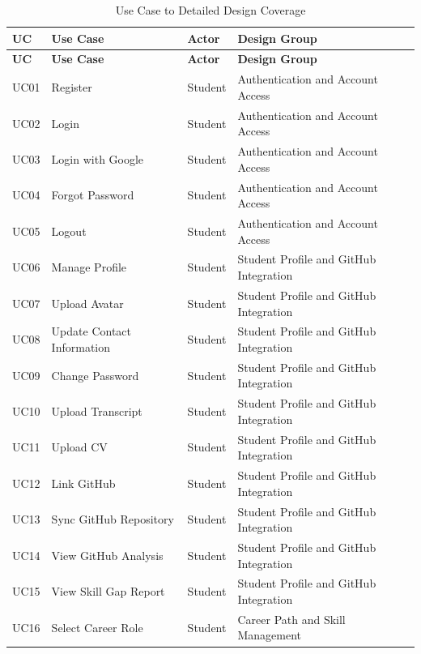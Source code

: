 \setlength{\tabcolsep}{2pt}
\scriptsize
\begin{longtable}{|>{\centering\arraybackslash}m{0.8cm}|>{\raggedright\arraybackslash}m{3.0cm}|>{\raggedright\arraybackslash}m{2.4cm}|>{\raggedright\arraybackslash}m{4.8cm}|}
\caption{Use Case to Detailed Design Coverage}
\label{tab:uc_detailed_design_coverage}
\\
\hline
\textbf{UC} & \textbf{Use Case} & \textbf{Actor} & \textbf{Design Group} \\
\hline
\endfirsthead
\hline
\textbf{UC} & \textbf{Use Case} & \textbf{Actor} & \textbf{Design Group} \\
\hline
\endhead
UC01 & Register & Student & Authentication and Account Access \\
\hline
UC02 & Login & Student & Authentication and Account Access \\
\hline
UC03 & Login with Google & Student & Authentication and Account Access \\
\hline
UC04 & Forgot Password & Student & Authentication and Account Access \\
\hline
UC05 & Logout & Student & Authentication and Account Access \\
\hline
UC06 & Manage Profile & Student & Student Profile and GitHub Integration \\
\hline
UC07 & Upload Avatar & Student & Student Profile and GitHub Integration \\
\hline
UC08 & Update Contact Information & Student & Student Profile and GitHub Integration \\
\hline
UC09 & Change Password & Student & Student Profile and GitHub Integration \\
\hline
UC10 & Upload Transcript & Student & Student Profile and GitHub Integration \\
\hline
UC11 & Upload CV & Student & Student Profile and GitHub Integration \\
\hline
UC12 & Link GitHub & Student & Student Profile and GitHub Integration \\
\hline
UC13 & Sync GitHub Repository & Student & Student Profile and GitHub Integration \\
\hline
UC14 & View GitHub Analysis & Student & Student Profile and GitHub Integration \\
\hline
UC15 & View Skill Gap Report & Student & Student Profile and GitHub Integration \\
\hline
UC16 & Select Career Role & Student & Career Path and Skill Management \\

\end{longtable}
